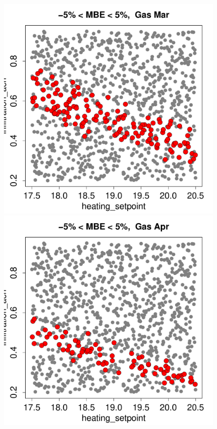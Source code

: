 \documentclass[a4paper, 12pt]{article}
\begin{document}
\begin{figure}
 \includegraphics[width=\scale]{MBE/SelectedMBE_Gas_03.pdf}\\
 \includegraphics[width=\scale]{MBE/SelectedMBE_Gas_04.pdf}

\end{figure}
\end{document}
